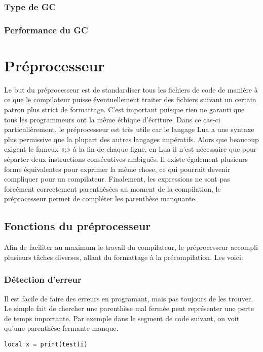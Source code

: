 \documentclass{article}
\begin{document}
\subsubsection{Type de GC}

\subsubsection{Performance du GC}

\newpage
\section{Préprocesseur}
Le but du préprocesseur est de standardiser tous les fichiers de code de manière à ce que le compilateur puisse éventuellement traiter des fichiers suivant un certain patron plus strict de formattage. C'est important puisque rien ne garanti que tous les programmeurs ont la même éthique d'écriture. Dans ce cas-ci particulièrement, le préprocesseur est très utile car le langage Lua a une syntaxe plus permissive que la plupart des autres langages impératifs. Alors que beaucoup exigent le fameux «;» à la fin de chaque ligne, en Lua il n'est nécessaire que pour séparter deux instructions consécutives ambiguës. Il existe également plusieurs forme équivalentes pour exprimer la même chose, ce qui pourrait devenir compliquer pour un compilateur. Finalement, les expressions ne sont pas forcément correctement parenthésées au moment de la compilation, le préprocesseur permet de compléter les parenthèse manquante.

\subsection{Fonctions du préprocesseur}
Afin de faciliter au maximum le travail du compilateur, le préprocesseur accompli plusieurs tâches diverses, allant du formattage à la précompilation. Les voici:

\subsubsection{Détection d'erreur}
Il est facile de faire des erreurs en programant, mais pas toujours de les trouver. Le simple fait de chercher une parenthèse mal fermée peut représenter une perte de temps importante. Par exemple dans le segment de code suivant, on voit qu'une parenthèse fermante manque.
\lstset{style = lua}
\begin{lstlisting}[caption={Mauvais parenthèsage},label=DescriptiveLabel]
  local x = print(test(i)
\end{lstlisting}
\end{document}
